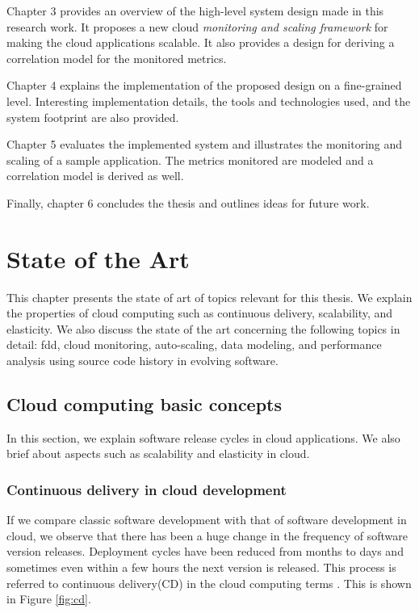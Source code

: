 \documentclass[article,type=msc,colorback,12pt,accentcolor=tud8b,table]{tudthesis}
\begin{document}
	Chapter 3 provides an overview of the high-level system design made in this research work. It proposes a new cloud \textit{monitoring and scaling framework} for making the cloud applications scalable. It also provides a design for deriving a correlation model for the monitored metrics.
	
	Chapter 4 explains the implementation of the proposed design on a fine-grained level. Interesting implementation details, the tools and technologies used, and the system footprint are also provided.  
	
	Chapter 5 evaluates the implemented system and illustrates the monitoring and scaling of a sample application. The metrics monitored are modeled and a correlation model is derived as well. 
	
	Finally, chapter 6 concludes the thesis and outlines ideas for future work.


	\cleardoublepage
 
 \hfill 
 \section{State of the Art}
  \hfill \break
 	
	This chapter presents the state of art of topics relevant for this thesis. We explain the properties of cloud computing such as continuous delivery, scalability, and elasticity. We also discuss the state of the art concerning the following topics in detail: \gls{fdd}, cloud monitoring, auto-scaling, data modeling, and performance analysis using source code history in evolving software.
	
		\subsection{Cloud computing basic concepts}
		
		In this section, we explain software release cycles in cloud applications. We also brief about aspects such as scalability and elasticity in cloud.
		
		\subsubsection{Continuous delivery in cloud development}
		If we compare classic software development with that of software development in cloud, we observe that there has been a huge change in the frequency of software version releases. Deployment cycles have been reduced from months to days and sometimes even within a few hours the next version is released. This process is referred to continuous delivery(CD) in the cloud computing terms \cite{humble2010continuous}. This is shown in Figure \ref{fig:cd}. 
		
\end{document}
